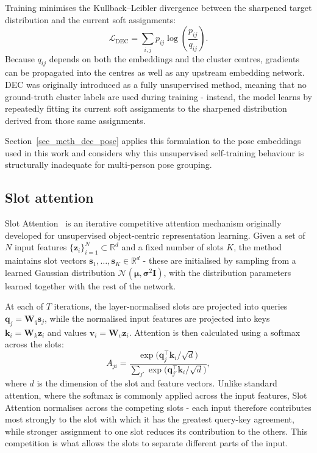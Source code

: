 Training minimises the Kullback--Leibler divergence
between the sharpened target distribution and the current soft assignments:
\begin{equation}
    \mathcal{L}_{\text{DEC}}
    = \sum_{i,j}
    p_{ij}\log\left(\frac{p_{ij}}{q_{ij}}\right).
\end{equation}
Because $q_{ij}$ depends on both the embeddings and the cluster centres,
gradients can be propagated into the centres as well as any upstream embedding network.
DEC was originally introduced as a fully unsupervised method,
meaning that no ground-truth cluster labels are used during training -
instead, the model learns by repeatedly fitting its current soft assignments
to the sharpened distribution derived from those same assignments.

Section~\ref{sec_meth_dec_pose} applies this formulation to the pose embeddings used in this work
and considers why this unsupervised self-training behaviour is structurally inadequate
for multi-person pose grouping.

\subsection{Slot attention}
\label{sec_meth_slotattn_prelim}

Slot Attention~\cite{locatello2020slotattention} is an iterative competitive attention mechanism
originally developed for unsupervised object-centric representation learning.
Given a set of $N$ input features $\{\mathbf{z}_i\}_{i=1}^{N} \subset \mathbb{R}^{d}$
and a fixed number of slots $K$,
the method maintains slot vectors $\mathbf{s}_1, \dots, \mathbf{s}_K \in \mathbb{R}^{d}$ -
these are initialised by sampling from a learned Gaussian distribution
$\mathcal{N}(\boldsymbol{\mu}, \boldsymbol{\sigma}^2\mathbf{I})$,
with the distribution parameters learned together with the rest of the network.

At each of $T$ iterations,
the layer-normalised slots are projected into queries $\mathbf{q}_j = \mathbf{W}_q\mathbf{s}_j$,
while the normalised input features are projected into keys $\mathbf{k}_i = \mathbf{W}_k\mathbf{z}_i$
and values $\mathbf{v}_i = \mathbf{W}_v\mathbf{z}_i$.
Attention is then calculated using a softmax across the slots:
\begin{equation}
    A_{ji}
    = \frac{\exp\bigl(\mathbf{q}_j^{\top}\mathbf{k}_i / \sqrt{d}\bigr)}
           {\sum_{j'} \exp\bigl(\mathbf{q}_{j'}^{\top}\mathbf{k}_i / \sqrt{d}\bigr)},
    \label{eq:slotattn_attention}
\end{equation}
where $d$ is the dimension of the slot and feature vectors.
Unlike standard attention,
where the softmax is commonly applied across the input features,
Slot Attention normalises across the competing slots -
each input therefore contributes most strongly to the slot with which it has the greatest query-key agreement,
while stronger assignment to one slot reduces its contribution to the others.
This competition is what allows the slots to separate different parts of the input.

